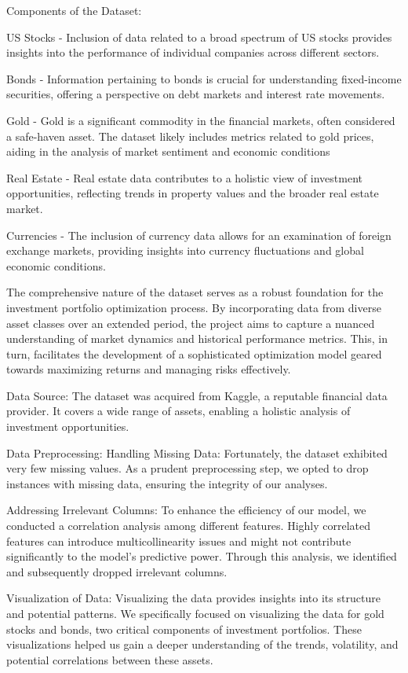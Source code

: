 \documentclass[conference]{IEEEtran}
\begin{document}
Components of the Dataset:

US Stocks - Inclusion of data related to a broad spectrum of US stocks provides insights into the performance of individual companies across different sectors. 

Bonds - Information pertaining to bonds is crucial for understanding fixed-income securities, offering a perspective on debt markets and interest rate movements.

Gold - Gold is a significant commodity in the financial markets, often considered a safe-haven asset. The dataset likely includes metrics related to gold prices, aiding in the analysis of market sentiment and economic conditions

Real Estate - Real estate data contributes to a holistic view of investment opportunities, reflecting trends in property values and the broader real estate market.

Currencies - The inclusion of currency data allows for an examination of foreign exchange markets, providing insights into currency fluctuations and global economic conditions.

The comprehensive nature of the dataset serves as a robust foundation for the investment portfolio optimization process. By incorporating data from diverse asset classes over an extended period, the project aims to capture a nuanced understanding of market dynamics and historical performance metrics. This, in turn, facilitates the development of a sophisticated optimization model geared towards maximizing returns and managing risks effectively.

Data Source: 
The dataset was acquired from Kaggle, a reputable financial data provider. It covers a wide range of assets, enabling a holistic analysis of investment opportunities.

Data Preprocessing:
Handling Missing Data: Fortunately, the dataset exhibited very few missing values. As a prudent preprocessing step, we opted to drop instances with missing data, ensuring the integrity of our analyses.

Addressing Irrelevant Columns: To enhance the efficiency of our model, we conducted a correlation analysis among different features. Highly correlated features can introduce multicollinearity issues and might not contribute significantly to the model’s predictive power. Through this analysis, we identified and subsequently dropped irrelevant columns.

Visualization of Data: Visualizing the data provides insights into its structure and potential patterns. We specifically focused on visualizing the data for gold stocks and bonds, two critical components of investment portfolios. These visualizations helped us gain a deeper understanding of the trends, volatility, and potential correlations between these assets.
\end{document}
